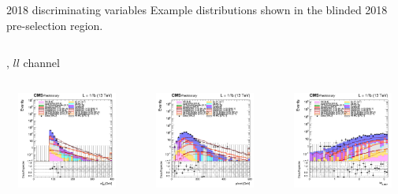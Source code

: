 \documentclass[8pt]{beamer}
\begin{document}
\begin{frame}{2018 discriminating variables}
Example distributions shown in the blinded 2018 pre-selection region. \vfill
\begin{columns}
\begin{column}{1.09\textwidth}
\begin{block}{, $ll$ channel}\end{block} \vspace{10pt}
\end{column}
\end{columns} \vspace{-5pt}
\begin{columns}
		\begin{column}{0.33\textwidth}
			\begin{center}
     			\includegraphics[width=1.0\textwidth, height=90pt]{figs/2018/log_cratio_topCR_ll_mt2ll.png}
    		\end{center}		
		\end{column} 
		\begin{column}{0.33\textwidth}
			\begin{center}
     			\includegraphics[width=1.0\textwidth, height=90pt]{figs/2018/log_cratio_topCR_ll_METcorrected_pt.png}
    		\end{center}		
		\end{column} 
		\begin{column}{0.33\textwidth}
			\begin{center}
     			\includegraphics[width=1.0\textwidth, height=90pt]{figs/2018/log_cratio_topCR_ll_dphillmet.png}

\end{center}
\end{column}
\end{columns}
\end{frame}
\end{document}
